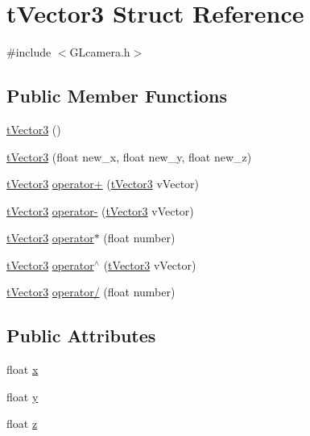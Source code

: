 \hypertarget{structt_vector3}{\section{t\+Vector3 Struct Reference}
\label{structt_vector3}
}


{\ttfamily \#include $<$G\+Lcamera.\+h$>$}

\subsection*{Public Member Functions}
\begin{DoxyCompactItemize}
\item 
\hyperlink{structt_vector3_a2d8c2e565268f2b90fc9bc60e6f89a35}{t\+Vector3} ()
\item 
\hyperlink{structt_vector3_ada2c2fab7bb7152b95be6e7c1a16be4c}{t\+Vector3} (float new\+\_\+x, float new\+\_\+y, float new\+\_\+z)
\item 
\hyperlink{structt_vector3}{t\+Vector3} \hyperlink{structt_vector3_a30a2afe00fea19f80180750988e758cf}{operator+} (\hyperlink{structt_vector3}{t\+Vector3} v\+Vector)
\item 
\hyperlink{structt_vector3}{t\+Vector3} \hyperlink{structt_vector3_a620e3f05ae5b72e1ca51ab8f5e79f2d9}{operator-\/} (\hyperlink{structt_vector3}{t\+Vector3} v\+Vector)
\item 
\hyperlink{structt_vector3}{t\+Vector3} \hyperlink{structt_vector3_ad00a82939bd0fa68ff90e378ff6592ee}{operator$\ast$} (float number)
\item 
\hyperlink{structt_vector3}{t\+Vector3} \hyperlink{structt_vector3_a0e7f54e0c885a9e994b04e4ee21959d2}{operator$^\wedge$} (\hyperlink{structt_vector3}{t\+Vector3} v\+Vector)
\item 
\hyperlink{structt_vector3}{t\+Vector3} \hyperlink{structt_vector3_a87476053d638c3e648570f2e02c1cc1d}{operator/} (float number)
\end{DoxyCompactItemize}
\subsection*{Public Attributes}
\begin{DoxyCompactItemize}
\item 
float \hyperlink{structt_vector3_a424ec48e8f7aab656bafa5796f493385}{x}
\item 
float \hyperlink{structt_vector3_ab2c9e6ddeb1bf79a3e85b264549efb3b}{y}
\item 
float \hyperlink{structt_vector3_abdbd8e973fd4634920a44119f329920f}{z}
\end{DoxyCompactItemize}


